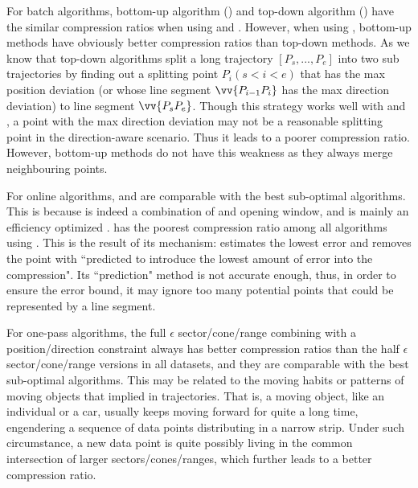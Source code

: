 For batch algorithms, bottom-up algorithm (\tpa) and top-down algorithm (\dpa) have the similar compression ratios when using \ped and \sed. However, when using \dad, bottom-up methods have obviously better compression ratios than top-down methods.  As we know that top-down algorithms split a long trajectory $[P_s, ..., P_e]$ into two sub trajectories by finding out a splitting point $P_i (s<i<e)$ that has the max position deviation (or whose line segment $\vv{P_{i-1}P_{i}}$ has the max direction deviation) to line segment $\vv{P_sP_{e}}$. Though this strategy works well with \ped and \sed, a point with the max direction deviation may not be a reasonable splitting point in the direction-aware scenario. Thus it leads to a poorer compression ratio. However, bottom-up methods do not have this weakness as they always merge neighbouring points.



For online algorithms, \bqsa and \opwa are comparable with the best sub-optimal algorithms. This is because \opwa is indeed a combination of \dpa and opening window, and \bqsa is mainly an efficiency optimized \opwa.
\squishe has the poorest compression ratio among all algorithms using \sed. This is the result of its mechanism: \squishe estimates the lowest \sed error and removes the point with ``predicted to introduce the lowest amount of error into the compression"\cite{Muckell:SQUISH}. Its ``prediction" method is not accurate enough, thus, in order to ensure the error bound, it may ignore too many potential points that could be represented by a line segment.

For one-pass algorithms, the full $\epsilon$ sector/cone/range combining with a position/direction constraint always has better compression ratios than the half $\epsilon$ sector/cone/range versions in all datasets, and they are comparable with the best sub-optimal algorithms.
This may be related to the moving habits or patterns of moving objects that implied in trajectories.
That is, a moving object, like an individual or a car, usually keeps moving forward for quite a long time, engendering a sequence of data points distributing in a narrow strip. Under such circumstance, a new data point is quite possibly living in the common intersection of larger sectors/cones/ranges, which further leads to a better compression ratio.








